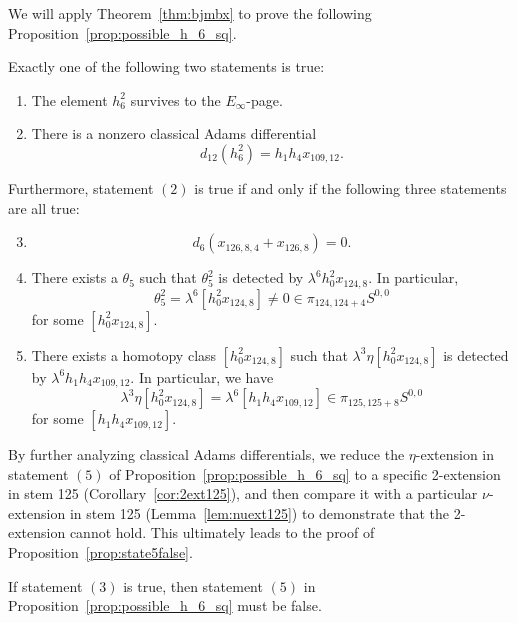 \documentclass{amsart}
\numberwithin{equation}{section}
\begin{document}
We will apply Theorem~\ref{thm:bjmbx} to prove the following Proposition~\ref{prop:possible_h_6_sq}.

\begin{proposition} \label{prop:possible_h_6_sq}\label{prop:possibleh62}
Exactly one of the following two statements is true:
\begin{enumerate}
    \item The element $h_6^2$ survives to the $E_\infty$-page.
   
    \item There is a nonzero classical Adams differential 
    $$d_{12}(h_6^2) = h_1h_4x_{109,12}.$$
\end{enumerate}
Furthermore, statement $(2)$ is true if and only if the following three statements are all true:
\begin{enumerate} \setcounter{enumi}{2}
    \item \leavevmode\vspace*{-\dimexpr\abovedisplayskip + \baselineskip}  
    $$d_6(x_{126,8,4} + x_{126,8}) = 0.$$
    
    \item There exists a $\theta_5$ such that 
    $\theta_5^2$ is detected by $\lambda^6 h_0^2x_{124,8}$. In particular, 
    $$\theta_5^2 = \lambda^6 [h_0^2x_{124,8}] \neq 0 \in \pi_{124,124+4}S^{0,0}$$
    for some $[h_0^2x_{124,8}]$.

    \item There exists a homotopy class $[h_0^2x_{124,8}]$ such that
    $\lambda^3 \eta [h_0^2x_{124,8}]$ is detected by $\lambda^6 h_1h_4x_{109,12}$. In particular, we have 
    $$\lambda^3 \eta [h_0^2x_{124,8}] = \lambda^6 [h_1h_4x_{109,12}] \in \pi_{125,125+8} S^{0,0}$$
    for some $[h_1h_4x_{109,12}]$.
\end{enumerate}
\end{proposition}

By further analyzing classical Adams differentials, we reduce the $\eta$-extension in statement $(5)$ of Proposition~\ref{prop:possible_h_6_sq} to a specific 2-extension in stem 125 (Corollary~\ref{cor:2ext125}), and then compare it with a particular $\nu$-extension in stem 125 (Lemma~\ref{lem:nuext125}) to demonstrate that the 2-extension cannot hold. This ultimately leads to the proof of Proposition~\ref{prop:state5false}.

\begin{proposition} \label{prop:state5false}
    If statement $(3)$ is true, then statement $(5)$ in Proposition~\ref{prop:possible_h_6_sq} must be false.
\end{proposition}
\end{document}
